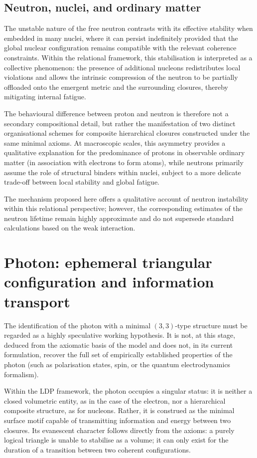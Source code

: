 \documentclass[11pt,a4paper]{article}
\begin{document}
\subsection{Neutron, nuclei, and ordinary matter}
The unstable nature of the free neutron contrasts with its effective stability when embedded in many nuclei, where it can persist indefinitely provided that the global nuclear configuration remains compatible with the relevant coherence constraints. Within the relational framework, this stabilisation is interpreted as a collective phenomenon: the presence of additional nucleons redistributes local violations and allows the intrinsic compression of the neutron to be partially offloaded onto the emergent metric and the surrounding closures, thereby mitigating internal fatigue.

The behavioural difference between proton and neutron is therefore not a secondary compositional detail, but rather the manifestation of two distinct organisational schemes for composite hierarchical closures constructed under the same minimal axioms. At macroscopic scales, this asymmetry provides a qualitative explanation for the predominance of protons in observable ordinary matter (in association with electrons to form atoms), while neutrons primarily assume the role of structural binders within nuclei, subject to a more delicate trade-off between local stability and global fatigue.

The mechanism proposed here offers a qualitative account of neutron instability within this relational perspective; however, the corresponding estimates of the neutron lifetime remain highly approximate and do not supersede standard calculations based on the weak interaction.

\section{Photon: ephemeral triangular configuration and information transport}

The identification of the photon with a minimal \((3,3)\)-type structure must be regarded as a highly speculative working hypothesis. It is not, at this stage, deduced from the axiomatic basis of the model and does not, in its current formulation, recover the full set of empirically established properties of the photon (such as polarisation states, spin, or the quantum electrodynamics formalism).

Within the LDP framework, the photon occupies a singular status: it is neither a closed volumetric entity, as in the case of the electron, nor a hierarchical composite structure, as for nucleons. Rather, it is construed as the minimal surface motif capable of transmitting information and energy between two closures. Its evanescent character follows directly from the axioms: a purely logical triangle is unable to stabilise as a volume; it can only exist for the duration of a transition between two coherent configurations.
\end{document}
